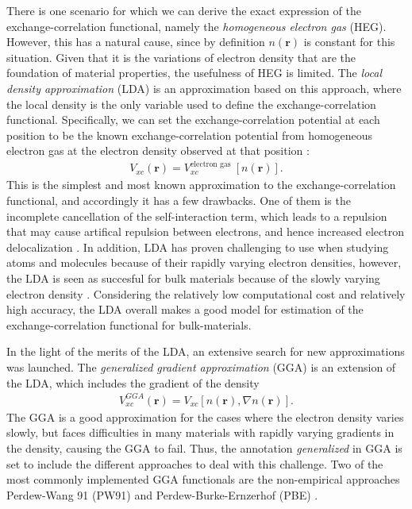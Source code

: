 There is one scenario for which we can derive the exact expression of the exchange-correlation functional, namely the \textit{homogeneous electron gas} (HEG). However, this has a natural cause, since by definition $n(\textbf{r})$ is constant for this situation. Given that it is the variations of electron density that are the foundation of material properties, the usefulness of HEG is limited. The \textit{local density approximation} (LDA) is an approximation based on this approach, where the local density is the only variable used to define the exchange-correlation functional. Specifically, we can set the exchange-correlation potential at each position to be the known exchange-correlation potential from homogeneous electron gas at the electron density observed at that position \cite{Kohn1965}:
\begin{align}
  V_{xc}(\textbf{r}) = V_{xc}^{\text{electron gas }}\left[n(\textbf{r})\right].
\end{align}
This is the simplest and most known approximation to the exchange-correlation functional, and accordingly it has a few drawbacks. One of them is the incomplete cancellation of the self-interaction term, which leads to a repulsion that may cause artifical repulsion between electrons, and hence increased electron delocalization \cite{Allen2014}. In addition, LDA has proven challenging  to use when studying atoms and molecules because of their rapidly varying electron densities, however, the LDA is seen as succesful for bulk materials because of the slowly varying electron density \cite{DavidSholl2009}. Considering the relatively low computational cost and relatively high accuracy, the LDA overall makes a good model for estimation of the exchange-correlation functional for bulk-materials.

In the light of the merits of the LDA, an extensive search for new approximations was launched. The \textit{generalized gradient approximation} (GGA) is an extension of the LDA, which includes the gradient of the density
\begin{align}
  V_{xc}^{GGA}(\textbf{r}) = V_{xc}\left[ n(\textbf{r}), \nabla n (\textbf{r})\right].
\end{align}
The GGA is a good approximation for the cases where the electron density varies slowly, but faces difficulties in many materials with rapidly varying gradients in the density, causing the GGA to fail. Thus, the annotation \textit{generalized} in GGA is set to include the different approaches to deal with this challenge. Two of the most commonly implemented GGA functionals are the non-empirical approaches Perdew-Wang 91 (PW91) \cite{Perdew1992} and Perdew-Burke-Ernzerhof (PBE) \cite{Perdew1996}.

